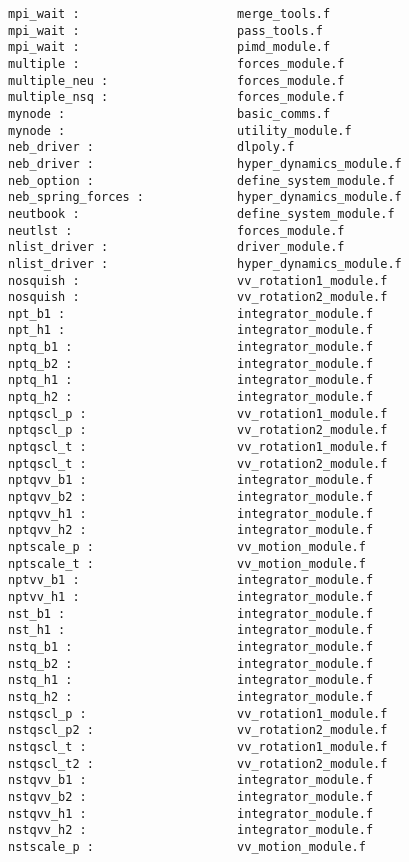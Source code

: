 \begin{verbatim}
mpi_wait :                      merge_tools.f
mpi_wait :                      pass_tools.f
mpi_wait :                      pimd_module.f
multiple :                      forces_module.f
multiple_neu :                  forces_module.f
multiple_nsq :                  forces_module.f
mynode :                        basic_comms.f 
mynode :                        utility_module.f 
neb_driver :                    dlpoly.f
neb_driver :                    hyper_dynamics_module.f
neb_option :                    define_system_module.f
neb_spring_forces :             hyper_dynamics_module.f
neutbook :                      define_system_module.f
neutlst :                       forces_module.f
nlist_driver :                  driver_module.f
nlist_driver :                  hyper_dynamics_module.f
nosquish :                      vv_rotation1_module.f
nosquish :                      vv_rotation2_module.f
npt_b1 :                        integrator_module.f
npt_h1 :                        integrator_module.f
nptq_b1 :                       integrator_module.f
nptq_b2 :                       integrator_module.f
nptq_h1 :                       integrator_module.f
nptq_h2 :                       integrator_module.f
nptqscl_p :                     vv_rotation1_module.f
nptqscl_p :                     vv_rotation2_module.f
nptqscl_t :                     vv_rotation1_module.f
nptqscl_t :                     vv_rotation2_module.f
nptqvv_b1 :                     integrator_module.f
nptqvv_b2 :                     integrator_module.f
nptqvv_h1 :                     integrator_module.f
nptqvv_h2 :                     integrator_module.f
nptscale_p :                    vv_motion_module.f
nptscale_t :                    vv_motion_module.f
nptvv_b1 :                      integrator_module.f
nptvv_h1 :                      integrator_module.f
nst_b1 :                        integrator_module.f
nst_h1 :                        integrator_module.f
nstq_b1 :                       integrator_module.f
nstq_b2 :                       integrator_module.f
nstq_h1 :                       integrator_module.f
nstq_h2 :                       integrator_module.f
nstqscl_p :                     vv_rotation1_module.f
nstqscl_p2 :                    vv_rotation2_module.f
nstqscl_t :                     vv_rotation1_module.f
nstqscl_t2 :                    vv_rotation2_module.f
nstqvv_b1 :                     integrator_module.f
nstqvv_b2 :                     integrator_module.f
nstqvv_h1 :                     integrator_module.f
nstqvv_h2 :                     integrator_module.f
nstscale_p :                    vv_motion_module.f

\end{verbatim}
